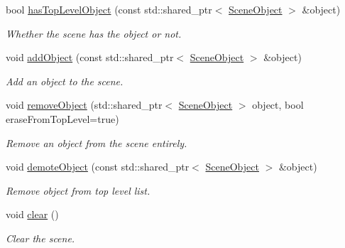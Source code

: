 \begin{Indent}
\begin{DoxyCompactItemize}
\item 
\mbox{\label{classrev_1_1_scene_abbd0ea70a217a39fee461d288a31da36}} 
bool \mbox{\hyperlink{classrev_1_1_scene_abbd0ea70a217a39fee461d288a31da36}{has\+Top\+Level\+Object}} (const std\+::shared\+\_\+ptr$<$ \mbox{\hyperlink{classrev_1_1_scene_object}{Scene\+Object}} $>$ \&object)
\begin{DoxyCompactList}\small\item\em Whether the scene has the object or not. \end{DoxyCompactList}\item 
\mbox{\label{classrev_1_1_scene_a3c08faa015cd0c0581e32b87a9028e42}} 
void \mbox{\hyperlink{classrev_1_1_scene_a3c08faa015cd0c0581e32b87a9028e42}{add\+Object}} (const std\+::shared\+\_\+ptr$<$ \mbox{\hyperlink{classrev_1_1_scene_object}{Scene\+Object}} $>$ \&object)
\begin{DoxyCompactList}\small\item\em Add an object to the scene. \end{DoxyCompactList}\item 
void \mbox{\hyperlink{classrev_1_1_scene_ae6b55d9ed736c0687ba1b60bd07faff7}{remove\+Object}} (std\+::shared\+\_\+ptr$<$ \mbox{\hyperlink{classrev_1_1_scene_object}{Scene\+Object}} $>$ object, bool erase\+From\+Top\+Level=true)
\begin{DoxyCompactList}\small\item\em Remove an object from the scene entirely. \end{DoxyCompactList}\item 
\mbox{\label{classrev_1_1_scene_aa775a4d4e56d28a9b5af5a616e6f9532}} 
void \mbox{\hyperlink{classrev_1_1_scene_aa775a4d4e56d28a9b5af5a616e6f9532}{demote\+Object}} (const std\+::shared\+\_\+ptr$<$ \mbox{\hyperlink{classrev_1_1_scene_object}{Scene\+Object}} $>$ \&object)
\begin{DoxyCompactList}\small\item\em Remove object from top level list. \end{DoxyCompactList}\item 
void \mbox{\hyperlink{classrev_1_1_scene_a6048d220281a8cd6249bf2685bd5de6c}{clear}} ()
\begin{DoxyCompactList}\small\item\em Clear the scene. \end{DoxyCompactList}\item 

\end{DoxyCompactItemize}
\end{Indent}
